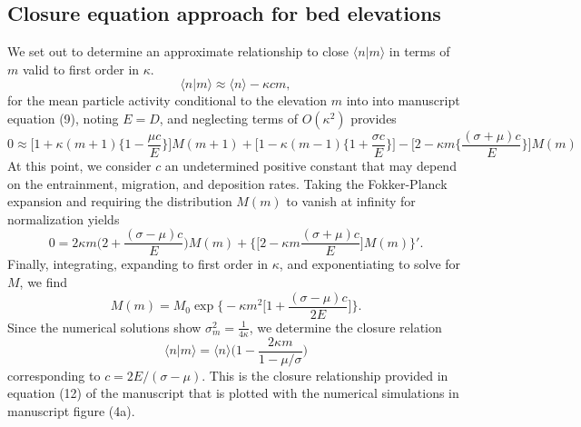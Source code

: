 \documentclass[11pt]{article}
\newcommand\be{\begin{equation}} %
\newcommand\ee{\end{equation}}   %
\begin{document}
\subsection{Closure equation approach for bed elevations}
We set out to determine an approximate relationship to close $\langle n | m \rangle$ in terms of $m$ valid to first order in $\kappa$.
\be \langle n | m \rangle \approx \langle n \rangle  - \kappa c m,\ee
for the mean particle activity conditional to the elevation $m$ into into manuscript equation (9), noting $E=D$, and neglecting terms of $O(\kappa^2)$ provides 
\be 0 \approx \Big[ 1+\kappa(m+1)\Big\{ 1-\frac{\mu c}{E}\Big\}\Big]M(m+1) + \Big[1-\kappa(m-1)\Big\{1+\frac{\sigma c}{E}\Big\}\Big]-\Big[2-\kappa m\Big\{\frac{(\sigma+\mu)c}{E}\Big\}\Big]M(m)
\ee
At this point, we consider $c$ an undetermined positive constant that may depend on the entrainment, migration, and deposition rates.
Taking the Fokker-Planck expansion and requiring the distribution $M(m)$ to vanish at infinity for normalization yields
\be 0 = 2\kappa m \Big( 2 + \frac{(\sigma-\mu)c}{E}\Big)M(m) + \Big\{
\Big[2-\kappa m \frac{(\sigma+\mu)c}{E} \Big]M(m)\Big\}'.\ee
Finally, integrating, expanding to first order in $\kappa$, and exponentiating to solve for $M$, we find
\be M(m) = M_0 \exp\Big\{-\kappa m^2 \Big[1 + \frac{(\sigma-\mu)c}{2E}\Big]\Big\}.\ee
Since the numerical solutions show $\sigma_m^2 = \frac{1}{4\kappa}$, we determine the closure relation
\be \langle n | m \rangle = \langle n \rangle\Big( 1-\frac{2\kappa m}{1-\mu/\sigma}\Big) \ee
corresponding to $c=2E/(\sigma-\mu)$. This is the closure relationship provided in equation (12) of the manuscript that is plotted with the numerical simulations in manuscript figure (4a).


\end{document}
